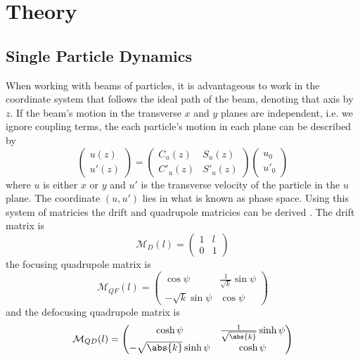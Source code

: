 
\section{Theory}

\subsection{Single Particle Dynamics}

When working with beams of particles, it is advantageous to work in the
coordinate system that follows the ideal path of the beam, denoting that axis by
\(z\). If the beam's motion in the transverse \(x\) and \(y\) planes are
independent, i.e. we ignore coupling terms, the each particle's motion in each
plane can be described by
\begin{equation}
	\begin{pmatrix}
		u(z) \\ u'(z)
	\end{pmatrix}
	=
	\begin{pmatrix}
		C_u(z)  & S_u(z)  \\
		C'_u(z) & S'_u(z)
	\end{pmatrix}
	\begin{pmatrix}
		u_0 \\ u'_0
	\end{pmatrix}
\end{equation}
where \(u\) is either \(x\) or \(y\) and \(u'\) is the transverse velocity of
the particle in the \(u\) plane. The coordinate \((u, u')\) lies in what is
known as phase space. Using this system of matricies the drift and quadrupole
matricies can be derived \cite{wiedemann2007particle}. The drift matrix is
\begin{equation}
	\mathcal{M}_D(l) =
	\begin{pmatrix}
		1 & l \\
		0 & 1
	\end{pmatrix}
	\label{eq:drift}
\end{equation}
the focusing quadrupole matrix is
\begin{equation}
	\mathcal{M}_{QF}(l) =
	\begin{pmatrix}
		\cos\psi & \frac{1}{\sqrt{k}}\sin\psi \\
		-\sqrt{k}\sin\psi & \cos\psi
	\end{pmatrix}
	\label{eq:qf}
\end{equation}
and the defocusing quadrupole matrix is
\begin{equation}
	\mathcal{M}_{QD}(l) =
	\begin{pmatrix}
		\cosh\psi & \frac{1}{\sqrt{\abs{k}}}\sinh\psi \\
		-\sqrt{\abs{k}}\sinh\psi & \cosh\psi
	\end{pmatrix}
	\label{eq:qd}
\end{equation}


